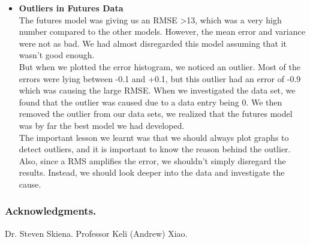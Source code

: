 \documentclass[runningheads]{llncs}
\begin{document}
\begin{itemize}
\item \textbf{Outliers in Futures Data} \\
The futures model was giving us an RMSE >13, which was a very high number compared to the other models. However, the mean error and variance were not as bad. We had almost disregarded this model assuming that it wasn't good enough. \\

But when we plotted the error histogram, we noticed an outlier. Most of the errors were lying between -0.1 and +0.1, but this outlier had an error of -0.9 which was causing the large RMSE. When we investigated the data set, we found that the outlier was caused due to a data entry being 0. We then removed the outlier from our data sets, we realized that the futures model was by far the best model we had developed. \\

The important lesson we learnt was that we should always plot graphs to detect outliers, and it is important to know the reason behind the outlier. Also, since a RMS amplifies the error, we shouldn't simply disregard the results. Instead, we should look deeper into the data and investigate the cause. 
\end{itemize}



\subsubsection*{Acknowledgments.} Dr. Steven Skiena. Professor Keli (Andrew) Xiao.
\end{document}

